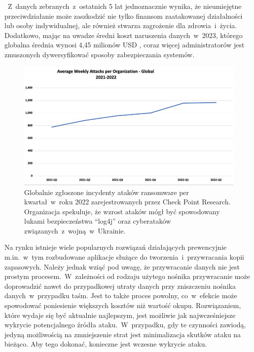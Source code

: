 ~Z~danych zebranych~z~ostatnich 5 lat jednoznacznie wynika, że nieumiejętne przeciwdziałanie może zaszkodzić nie tylko finansom zaatakowanej działalności lub osoby indywidualnej, ale również stwarza zagrożenie dla zdrowia~i~życia.
 Dodatkowo, mając na uwadze średni koszt naruszenia danych~w~2023, którego globalna średnia wynosi 4,45 milionów USD \cite{petrosyan_global_cost},
 coraz więcej administratorów jest zmuszonych dywersyfikować sposoby zabezpieczania systemów. 
 \begin{figure}[H]
     \centering
     \includegraphics[width=0.75\linewidth]{rysunki/Global-Quarterly-attacks-from-Q1-2021- Q2-2022.png}
     \caption{Globalnie zgłoszone incydenty ataków ransomware per kwartał~w~roku 2022 zarejestrowanych przez Check Point Research. Organizacja spekuluje, że wzrost ataków mógł być spowodowany lukami bezpieczeństwa \foreignquote{english}{log4j} oraz cyberataków związanych~z~wojną~w~Ukrainie\protect\footnotemark.}
     \label{fig:enter-label}
 \end{figure}

 Na rynku istnieje wiele popularnych rozwiązań działających prewencyjnie m.in.~w~tym rozbudowane aplikacje służące do tworzenia~i~przywracania kopii zapasowych. Należy jednak wziąć pod uwagę, że przywracanie danych nie jest prostym procesem.~W~zależności od rodzaju użytego nośnika przywracanie może doprowadzić nawet do przypadkowej utraty danych przy zniszczeniu nośnika danych~w~przypadku taśm. Jest to także proces powolny, co~w~efekcie może spowodować poniesienie większych kosztów niż wartość okupu.
 \newline
 Rozwiązaniem, które wydaje się być aktualnie najlepszym, jest możliwie jak najwcześniejsze wykrycie potencjalnego źródła ataku.~W~przypadku, gdy te czynności zawiodą, jedyną możliwością na zmniejszenie strat jest minimalizacja skutków ataku na bieżąco. Aby tego dokonać, konieczne jest wczesne wykrycie ataku.
 
